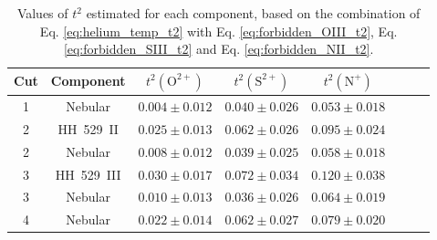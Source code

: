 \documentclass[fleqn,usenatbib]{mnras}
\begin{document}
\begin{table*}
\centering
\caption{Values of $t^2$ estimated for each component, based on the combination of Eq. \eqref{eq:helium_temp_t2} with Eq. \eqref{eq:forbidden_OIII_t2}, Eq. \eqref{eq:forbidden_SIII_t2} and Eq. \eqref{eq:forbidden_NII_t2}.}
\label{tab:t2_per_comp}
\begin{tabular}{cccccccc}
\hline
Cut &  Component & $t^2(\text{O}^{2+})$& $t^2(\text{S}^{2+})$& $t^2(\text{N}^{+})$\\
\hline
1&Nebular&$0.004 \pm 0.012$&$0.040 \pm 0.026$&$0.053 \pm 0.018$\\
2&HH~529~II&$0.025 \pm 0.013$&$0.062 \pm 0.026$&$0.095 \pm 0.024$\\
2&Nebular&$0.008 \pm 0.012$&$0.039 \pm 0.025$&$0.058 \pm 0.018$\\
3&HH~529~III&$0.030 \pm 0.017$ & $0.072 \pm 0.034$ & $0.120 \pm 0.038$ \\
3&Nebular&$0.010 \pm 0.013$&$0.036 \pm 0.026$&$0.064 \pm 0.019$\\
4&Nebular&$0.022 \pm 0.014$&$0.062 \pm 0.027$&$0.079 \pm 0.020$\\
\hline
\end{tabular}
\end{table*}
\end{document}
